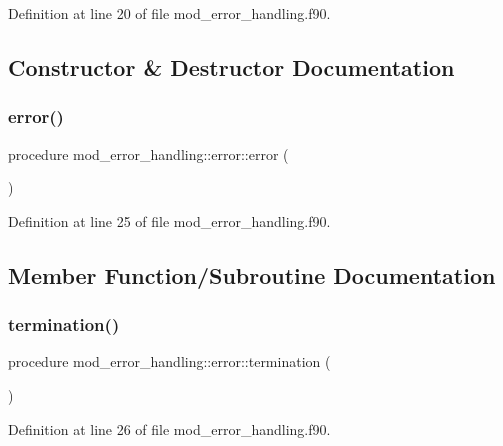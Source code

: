 Definition at line 20 of file mod\+\_\+error\+\_\+handling.\+f90.



\subsection{Constructor \& Destructor Documentation}
\mbox{\label{structmod__error__handling_1_1error_a154c9140ca242401fed44b67d2b855fe}} 
\subsubsection{\texorpdfstring{error()}{error()}}
{\footnotesize\ttfamily procedure mod\+\_\+error\+\_\+handling\+::error\+::error (\begin{DoxyParamCaption}{ }\end{DoxyParamCaption})}



Definition at line 25 of file mod\+\_\+error\+\_\+handling.\+f90.



\subsection{Member Function/\+Subroutine Documentation}
\mbox{\label{structmod__error__handling_1_1error_a9a38f19a843710ec0b4284e29cd8f6f0}} 
\subsubsection{\texorpdfstring{termination()}{termination()}}
{\footnotesize\ttfamily procedure mod\+\_\+error\+\_\+handling\+::error\+::termination (\begin{DoxyParamCaption}{ }\end{DoxyParamCaption})}



Definition at line 26 of file mod\+\_\+error\+\_\+handling.\+f90.



